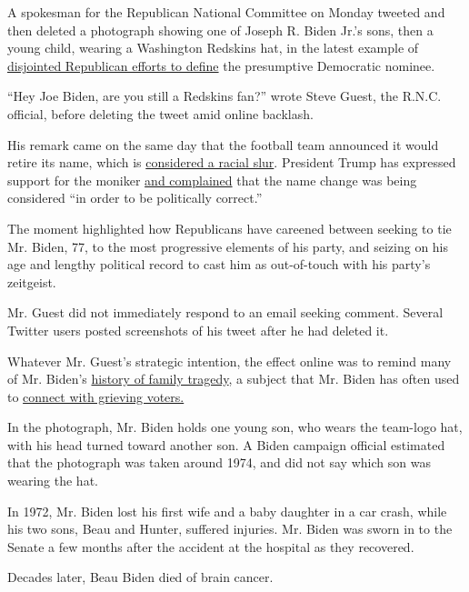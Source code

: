 A spokesman for the Republican National Committee on Monday tweeted and
then deleted a photograph showing one of Joseph R. Biden Jr.'s sons,
then a young child, wearing a Washington Redskins hat, in the latest
example of
\href{https://www.nytimes.com/2020/07/10/us/biden-trump.html}{disjointed
Republican efforts to define} the presumptive Democratic nominee.

``Hey Joe Biden, are you still a Redskins fan?'' wrote Steve Guest, the
R.N.C. official, before deleting the tweet amid online backlash.

His remark came on the same day that the football team announced it
would retire its name, which is
\href{https://www.nytimes.com/2020/07/13/sports/football/washington-redskins-new-name.html}{considered
a racial slur}. President Trump has expressed support for the moniker
\href{https://www.nytimes.com/2020/07/06/sports/football/washington-team-name-change.html}{and
complained} that the name change was being considered ``in order to be
politically correct.''

The moment highlighted how Republicans have careened between seeking to
tie Mr. Biden, 77, to the most progressive elements of his party, and
seizing on his age and lengthy political record to cast him as
out-of-touch with his party's zeitgeist.

Mr. Guest did not immediately respond to an email seeking comment.
Several Twitter users posted screenshots of his tweet after he had
deleted it.

Whatever Mr. Guest's strategic intention, the effect online was to
remind many of Mr. Biden's
\href{https://www.nytimes.com/2020/06/11/us/politics/joe-biden-funeral-speech.html}{history
of family tragedy}, a subject that Mr. Biden has often used to
\href{https://www.nytimes.com/2019/05/30/us/politics/joe-biden-beau-biden-death.html}{connect
with grieving voters.}

In the photograph, Mr. Biden holds one young son, who wears the
team-logo hat, with his head turned toward another son. A Biden campaign
official estimated that the photograph was taken around 1974, and did
not say which son was wearing the hat.

In 1972, Mr. Biden lost his first wife and a baby daughter in a car
crash, while his two sons, Beau and Hunter, suffered injuries. Mr. Biden
was sworn in to the Senate a few months after the accident at the
hospital as they recovered.

Decades later, Beau Biden died of brain cancer.

